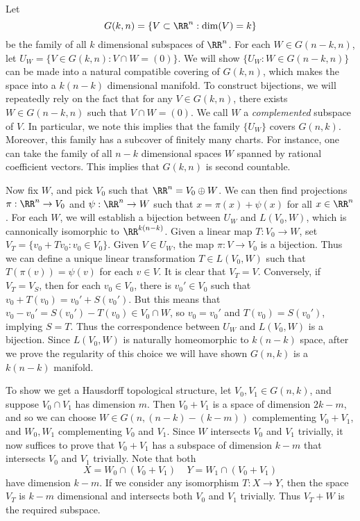 \begin{example}[Grassmannian]
    Let
    \[ G(k,n) = \{ V \subset \RR^n : \dim(V) = k \} \]
    be the family of all $k$ dimensional subspaces of $\RR^n$. For each $W \in G(n-k,n)$, let $U_W = \{ V \in G(k,n): V \cap W = (0) \}$. We will show $\{ U_W : W \in G(n-k,n) \}$ can be made into a natural compatible covering of $G(k,n)$, which makes the space into a $k(n-k)$ dimensional manifold. To construct bijections, we will repeatedly rely on the fact that for any $V \in G(k,n)$, there exists $W \in G(n-k,n)$ such that $V \cap W = (0)$. We call $W$ a \emph{complemented} subspace of $V$. In particular, we note this implies that the family $\{ U_W \}$ covers $G(n,k)$. Moreover, this family has a subcover of finitely many charts. For instance, one can take the family of all $n-k$ dimensional spaces $W$ spanned by rational coefficient vectors. This implies that $G(k,n)$ is second countable.

    Now fix $W$, and pick $V_0$ such that $\RR^n = V_0 \oplus W$. We can then find projections $\pi: \RR^n \to V_0$ and $\psi: \RR^n \to W$ such that $x = \pi(x) + \psi(x)$ for all $x \in \RR^n$. For each $W$, we will establish a bijection between $U_W$ and $L(V_0,W)$, which is cannonically isomorphic to $\RR^{k(n-k)}$. Given a linear map $T: V_0 \to W$, set $V_T = \{ v_0 + Tv_0 : v_0 \in V_0 \}$. Given $V \in U_W$, the map $\pi: V \to V_0$ is a bijection. Thus we can define a unique linear transformation $T \in L(V_0,W)$ such that $T(\pi(v)) = \psi(v)$ for each $v \in V$. It is clear that $V_T = V$. Conversely, if $V_T = V_S$, then for each $v_0 \in V_0$, there is $v_0' \in V_0$ such that $v_0 + T(v_0) = v_0' + S(v_0')$. But this means that $v_0 - v_0' = S(v_0') - T(v_0) \in V_0 \cap W$, so $v_0 = v_0'$ and $T(v_0) = S(v_0')$, implying $S = T$. Thus the correspondence between $U_W$ and $L(V_0,W)$ is a bijection. Since $L(V_0,W)$ is naturally homeomorphic to $k(n-k)$ space, after we prove the regularity of this choice we will have shown $G(n,k)$ is a $k(n-k)$ manifold.

    To show we get a Hausdorff topological structure, let $V_0,V_1 \in G(n,k)$, and suppose $V_0 \cap V_1$ has dimension $m$. Then $V_0 + V_1$ is a space of dimension $2k - m$, and so we can choose $W \in G(n,(n - k) - (k - m))$ complementing $V_0 + V_1$, and $W_0, W_1$ complementing $V_0$ and $V_1$. Since $W$ intersects $V_0$ and $V_1$ trivially, it now suffices to prove that $V_0 + V_1$ has a subspace of dimension $k - m$ that intersects $V_0$ and $V_1$ trivially. Note that both
    \[ X = W_0 \cap (V_0 + V_1)\ \ \ \ \ Y = W_1 \cap (V_0 + V_1) \]
    have dimension $k - m$. If we consider any isomorphism $T: X \to Y$, then the space $V_T$ is $k-m$ dimensional and intersects both $V_0$ and $V_1$ trivially. Thus $V_T + W$ is the required subspace.  


\end{example}
